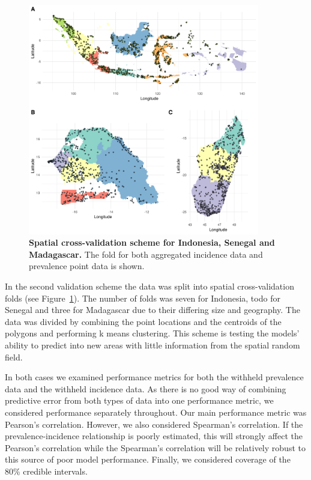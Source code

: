\documentclass[10pt,letterpaper]{article}
\begin{document}
\begin{figure}[!h]
\centering

\includegraphics[width = 0.9\textwidth]{figures/spatial_crossvalidation_full.png} %

\caption{{\bf Spatial cross-validation scheme for Indonesia, Senegal and Madagascar.} The fold for both aggregated incidence data and prevalence point data is shown.}
\label{fig:cv_spatial}
\end{figure}



In the second validation scheme the data was split into spatial cross-validation folds (see Figure~\ref{fig:cv_spatial}).
The number of folds was seven for Indonesia, todo for Senegal and three for Madagascar due to their differing size and geography.
The data was divided by combining the point locations and the centroids of the polygons and performing k means clustering.
This scheme is testing the models' ability to predict into new areas with little information from the spatial random field.

In both cases we examined performance metrics for both the withheld prevalence data and the withheld incidence data.
As there is no good way of combining predictive error from both types of data into one performance metric, we considered performance separately throughout.
Our main performance metric was Pearson's correlation.
However, we also considered Spearman's correlation.
If the prevalence-incidence relationship is poorly estimated, this will strongly affect the Pearson's correlation while the Spearman's correlation will be relatively robust to this source of poor model performance.
Finally, we considered coverage of the 80\% credible intervals.
\end{document}
